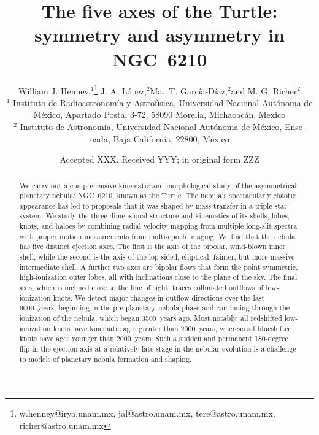 \documentclass[useAMS, usenatbib]{mnras}
\title{
  The five axes of the Turtle: symmetry and asymmetry in NGC~6210
}
\author[Henney et al.]{
  William J. Henney,\(^1\)\thanks{
    w.henney@irya.unam.mx,
    jal@astro.unam.mx,
    tere@astro.unam.mx,
    richer@astro.unam.mx
  }
  J. A. López,\(^2\)\footnotemark[1]
  Ma.\ T. García-Díaz,\(^2\)\footnotemark[1]
  and M. G. Richer\(^2\)\footnotemark[1]
  \\
  \(^1\)\foreignlanguage{spanish}{
    Instituto de Radioastronomía y
    Astrofísica, Universidad Nacional Autónoma de México, Apartado
    Postal 3-72, 58090 Morelia, Michaoacán, Mexico}
  \\
  \(^2\)\foreignlanguage{spanish}{
    Instituto de Astronomía,
    Universidad Nacional Autónoma de México,
    Ensenada, Baja California, 22800, México}
}
\date{Accepted XXX. Received YYY; in original form ZZZ}
\begin{document}
 
\label{firstpage}
\pagerange{\pageref{firstpage}--\pageref{lastpage}}
\maketitle

\begin{abstract}
  We carry out a comprehensive kinematic and morphological study
  of the asymmetrical planetary nebula:
  NGC~6210, known as the Turtle.
  The nebula's spectacularly chaotic appearance has led to proposals that it was shaped by mass transfer in a triple star system.
  We study the three-dimensional structure and kinematics
  of its shells, lobes, knots, and haloes
  by combining radial velocity mapping from multiple long-slit spectra
  with proper motion measurements from multi-epoch imaging.
  We find that the nebula has five distinct ejection axes.
  The first is the axis of the bipolar, wind-blown inner shell,
  while the second is the axis of the lop-sided, elliptical, fainter, but more massive intermediate shell.
  A further two axes are bipolar flows that form the point symmetric,
  high-ionization outer lobes, all with inclinations close to the plane of the sky.
  The final axis, which is inclined close to the line of sight,
  traces collimated outflows of low-ionization knots.
  We detect major changes in outflow directions over the last 6000~years,
  beginning in the pre-planetary nebula phase
  and continuing through the ionization of the nebula, which began 3500~years ago.
  Most notably,
  all redshifted low-ionization knots have kinematic ages greater than 2000~years,
  whereas all blueshifted knots have ages younger than 2000~years. 
  Such a sudden and permanent 180-degree flip in the ejection axis
  at a relatively late stage in the nebular evolution is a challenge to models of planetary nebula formation and shaping.
\end{abstract}
\end{document}
